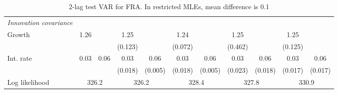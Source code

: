 \begin{table}[htbp]
\begin{tabular}{@{\extracolsep{4pt}}lcccccccccc@{}}
\rule{0pt}{4ex} \emph{Innovation covariance}  	 & 	 & 	 & 	 & 	 & 	 & 	 & 	 & 	 & 	 &\\ 
\quad Growth 	 &1.26 	 &  	 & 1.25 	 &  	 & 1.24 	 &  	 & 1.25 	 &  	 & 1.25 	 & 	 \\ 
 		 &  	 &  	 & (0.123) 	 &  	 & (0.072) 	 &  	 & (0.462) 	 &  	 & (0.125) 	 &  	 \\ 
\quad Int. rate 	 &0.03 	 & 0.06 	 & 0.03 	 & 0.06 	 & 0.03 	 & 0.06 	 & 0.03 	 & 0.06 	 & 0.03 	 & 0.06	 \\ 
 		 &  	 &  	 & (0.018) 	 & (0.005) 	 & (0.018) 	 & (0.005) 	 & (0.023) 	 & (0.018) 	 & (0.017) 	 & (0.017) 	 \\ 
 \hline \rule{0pt}{4ex} 
  Log likelihood 	 &\multicolumn{2}{c}{326.2} 	 & \multicolumn{2}{c}{326.2} 	 & \multicolumn{2}{c}{328.4} 	 & \multicolumn{2}{c}{327.8} 	 & \multicolumn{2}{c}{330.9}\\ 

 \hline 	\end{tabular}		\caption{2-lag test VAR for FRA. In restricted MLEs, mean difference is 0.1}
		\label{tab:FRA2lag}

\end{table}